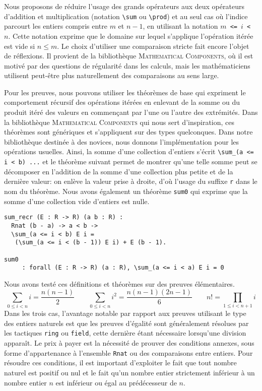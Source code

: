 \documentclass{jflart}
\newcommand{\cmd}[1]{\texttt{\textbackslash {#1}}}
\newcommand{\mathcomp}{\textsc{Mathematical Components}}
\begin{document}
Nous proposons de réduire l'usage des grands opérateurs aux deux
opérateurs d'addition et multiplication (notation \cmd{sum} ou \cmd{prod})
et au seul cas où
l'indice parcourt les entiers compris entre \({m}\) et \({n - 1}\),
en utilisant la notation \texttt{\(m\) <= \(i\) < \(n\)}.  Cette
notation exprime que le domaine sur lequel s'applique l'opération
itérée est vide si \(n \leq m\).  Le choix d'utiliser une comparaison
stricte fait encore l'objet de réflexions.  Il provient de la bibliothèque
\mathcomp{}, où il est motivé par des questions de régularité dans les calculs,
mais les mathématiciens utilisent
peut-être plus naturellement des comparaisons au sens large.

Pour les preuves, nous pouvons utiliser les théorèmes de base qui
expriment le comportement récursif des opérations itérées
en enlevant de la somme ou du produit itéré des valeurs en commençant
par l'une ou l'autre des extrémités.  Dans la bibliothèque \mathcomp{}
qui nous sert d'inspiration, ces théorèmes sont génériques et s'appliquent
sur des types quelconques.  Dans notre bibliothèque destinée à des novices,
nous donnons l'implémentation pour les opérations usuelles.  Ainsi, la
somme d'une collection d'entiers s'écrit
\texttt{\cmd{}sum\_(a <= i < b) ...} et
le théorème suivant permet de montrer qu'une telle somme peut se décomposer
en l'addition de la somme d'une collection plus petite et de la dernière
valeur: on enlève la valeur prise à droite, d'où l'usage du suffixe \texttt{r}
dans le nom du théorème.  Nous avons également un théorème \texttt{sum0}
qui exprime que la somme d'une collection vide d'entiers est nulle.


\begin{verbatim}
sum_recr (E : R -> R) (a b : R) :
  Rnat (b - a) -> a < b ->
  \sum_(a <= i < b) E i =
   (\sum_(a <= i < (b - 1)) E i) + E (b - 1).

sum0
     : forall (E : R -> R) (a : R), \sum_(a <= i < a) E i = 0
\end{verbatim}

Nous avons testé ces définitions et théorèmes sur des preuves élémentaires.
\[\sum_{0 \leq i < n} i = \frac{n (n - 1)}{2} \qquad
\sum_{0 \leq i < n} i ^2 = \frac{n (n - 1) (2 n - 1)}{6} \qquad
n! = \prod_{1 \leq i < n + 1} i\]
Dans les trois cas, l'avantage notable par rapport aux preuves
utilisant le type des entiers naturels est que les preuves d'égalité
sont généralement résolues par les tactiques \texttt{ring} ou \texttt{field},
cette dernière étant nécessaire
lorsqu'une division apparaît.  Le prix à payer est la nécessité de
prouver des conditions annexes, sous forme d'appartenance à l'ensemble
\texttt{Rnat} ou des comparaisons entre entiers.  Pour résoudre ces
conditions, il est important d'exploiter le fait que tout nombre
naturel est positif ou nul et le fait qu'un nombre entier
strictement inférieur à un nombre entier \(n\) est inférieur ou égal au
prédécesseur de \(n\).
\end{document}

